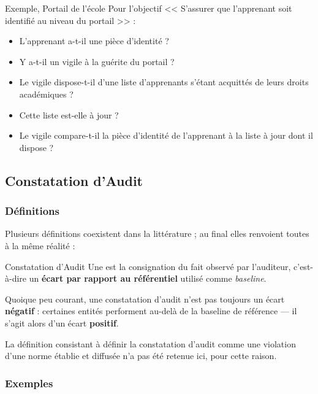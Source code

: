 \begin{boxlizbiz}{Exemple, Portail de l'école}
Pour l'objectif << S'assurer que l'apprenant soit identifié au niveau du portail >> :
\begin{itemize}
  \item L'apprenant a-t-il une pièce d'identité ?
  \item Y a-t-il un vigile à la guérite du portail ?
  \item Le vigile dispose-t-il d'une liste d'apprenants s'étant acquittés de leurs droits
    académiques ?
  \item Cette liste est-elle à jour ?
  \item Le vigile compare-t-il la pièce d'identité de l'apprenant à la liste à jour dont
    il dispose ?
\end{itemize}
\end{boxlizbiz}

\subsection{Constatation d'Audit}

\subsubsection{Définitions}

Plusieurs définitions coexistent dans la littérature ; au final elles renvoient toutes
à la même réalité :

\begin{boxdef}{Constatation d'Audit}
Une  est la consignation du fait observé par l'auditeur,
c'est-à-dire un \textbf{écart par rapport au référentiel} utilisé comme
\textit{baseline}.

Quoique peu courant, une constatation d'audit n'est pas toujours un écart
\textbf{négatif} : certaines entités performent au-delà de la baseline de référence —
il s'agit alors d'un écart \textbf{positif}.
\end{boxdef}

La définition consistant à définir la constatation d'audit comme une violation d'une
norme établie et diffusée n'a pas été retenue ici, pour cette raison.

\subsubsection{Exemples}

